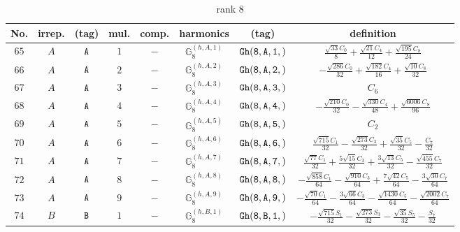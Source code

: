 \documentclass[fleqn,8pt]{jsarticle}
\begin{document}
\begin{table}[ht!]
\begin{center}
\caption{rank 8}
\renewcommand{\arraystretch}{1.3}
\begin{tabular}{cccccccc} \hline \hline
No. & irrep. & (tag) & mul. & comp. & harmonics & (tag) & definition \\ \hline
$ 65 $ & $ A $ & $ {\tt A} $ & $ 1 $ & $ - $ & $ \mathbb{G}_{8}^{(h,A,1)} $ & $ {\tt Gh(8,A,1,)} $ & $ \frac{\sqrt{33} C_{0}}{8} + \frac{\sqrt{21} C_{4}}{12} + \frac{\sqrt{195} C_{8}}{24} $ \\
$ 66 $ & $ A $ & $ {\tt A} $ & $ 2 $ & $ - $ & $ \mathbb{G}_{8}^{(h,A,2)} $ & $ {\tt Gh(8,A,2,)} $ & $ - \frac{\sqrt{286} C_{0}}{32} + \frac{\sqrt{182} C_{4}}{16} + \frac{\sqrt{10} C_{8}}{32} $ \\
$ 67 $ & $ A $ & $ {\tt A} $ & $ 3 $ & $ - $ & $ \mathbb{G}_{8}^{(h,A,3)} $ & $ {\tt Gh(8,A,3,)} $ & $ C_{6} $ \\
$ 68 $ & $ A $ & $ {\tt A} $ & $ 4 $ & $ - $ & $ \mathbb{G}_{8}^{(h,A,4)} $ & $ {\tt Gh(8,A,4,)} $ & $ - \frac{\sqrt{210} C_{0}}{32} - \frac{\sqrt{330} C_{4}}{48} + \frac{\sqrt{6006} C_{8}}{96} $ \\
$ 69 $ & $ A $ & $ {\tt A} $ & $ 5 $ & $ - $ & $ \mathbb{G}_{8}^{(h,A,5)} $ & $ {\tt Gh(8,A,5,)} $ & $ C_{2} $ \\
$ 70 $ & $ A $ & $ {\tt A} $ & $ 6 $ & $ - $ & $ \mathbb{G}_{8}^{(h,A,6)} $ & $ {\tt Gh(8,A,6,)} $ & $ \frac{\sqrt{715} C_{1}}{32} - \frac{\sqrt{273} C_{3}}{32} + \frac{\sqrt{35} C_{5}}{32} - \frac{C_{7}}{32} $ \\
$ 71 $ & $ A $ & $ {\tt A} $ & $ 7 $ & $ - $ & $ \mathbb{G}_{8}^{(h,A,7)} $ & $ {\tt Gh(8,A,7,)} $ & $ \frac{\sqrt{77} C_{1}}{32} + \frac{5 \sqrt{15} C_{3}}{32} + \frac{3 \sqrt{13} C_{5}}{32} - \frac{\sqrt{455} C_{7}}{32} $ \\
$ 72 $ & $ A $ & $ {\tt A} $ & $ 8 $ & $ - $ & $ \mathbb{G}_{8}^{(h,A,8)} $ & $ {\tt Gh(8,A,8,)} $ & $ - \frac{\sqrt{858} C_{1}}{64} - \frac{\sqrt{910} C_{3}}{64} + \frac{7 \sqrt{42} C_{5}}{64} - \frac{3 \sqrt{30} C_{7}}{64} $ \\
$ 73 $ & $ A $ & $ {\tt A} $ & $ 9 $ & $ - $ & $ \mathbb{G}_{8}^{(h,A,9)} $ & $ {\tt Gh(8,A,9,)} $ & $ - \frac{\sqrt{70} C_{1}}{64} - \frac{3 \sqrt{66} C_{3}}{64} - \frac{\sqrt{1430} C_{5}}{64} - \frac{\sqrt{2002} C_{7}}{64} $ \\
$ 74 $ & $ B $ & $ {\tt B} $ & $ 1 $ & $ - $ & $ \mathbb{G}_{8}^{(h,B,1)} $ & $ {\tt Gh(8,B,1,)} $ & $ - \frac{\sqrt{715} S_{1}}{32} - \frac{\sqrt{273} S_{3}}{32} - \frac{\sqrt{35} S_{5}}{32} - \frac{S_{7}}{32} $ \\

\end{tabular}
\end{center}
\end{table}
\end{document}

